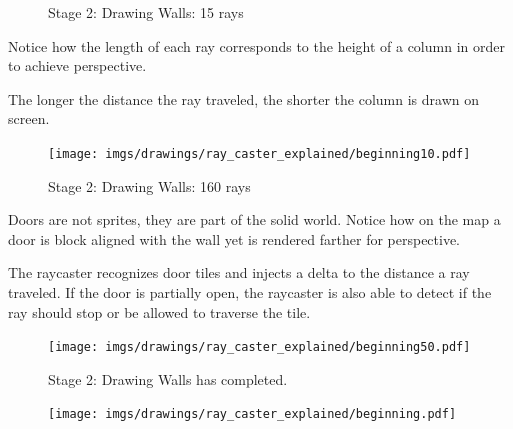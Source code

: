 \begin{figure}[H]
 \centering
  \caption{Stage 2: Drawing Walls: 15 rays} 
\end{figure}
\begin{minipage}{.4\textwidth}
Notice how the length of each ray corresponds to the height of a column in order to achieve perspective.\\
\par
The longer the distance the ray traveled, the shorter the column is drawn on screen.
 \end{minipage}
\begin{minipage}{.6\textwidth}
\begin{figure}[H]
  \centering
 \texttt{[image: imgs/drawings/ray\_caster\_explained/beginning10.pdf]}
   
\end{figure}
\end{minipage}




 
\begin{figure}[H]
 \centering
 \caption{Stage 2: Drawing Walls: 160 rays}  
\end{figure}
 \begin{minipage}{.4\textwidth}
 Doors are not sprites, they are part of the solid world. Notice how on the map a door is block aligned with the wall yet is rendered farther for perspective.\\
 \par
 The raycaster recognizes door tiles and injects a delta to the distance a ray traveled. If the door is partially open, the raycaster is also able to detect if the ray should stop or be allowed to traverse the tile.
 \end{minipage}
\begin{minipage}{.6\textwidth}
\begin{figure}[H]
  \centering
 \texttt{[image: imgs/drawings/ray\_caster\_explained/beginning50.pdf]}
   
\end{figure}
\end{minipage}



 
 \begin{figure}[H]
\centering
 \caption{Stage 2: Drawing Walls has completed.} 
 \end{figure}
\begin{minipage}{\textwidth}
\begin{figure}[H]
  \centering
 \texttt{[image: imgs/drawings/ray\_caster\_explained/beginning.pdf]}
   
\end{figure}
\end{minipage}




